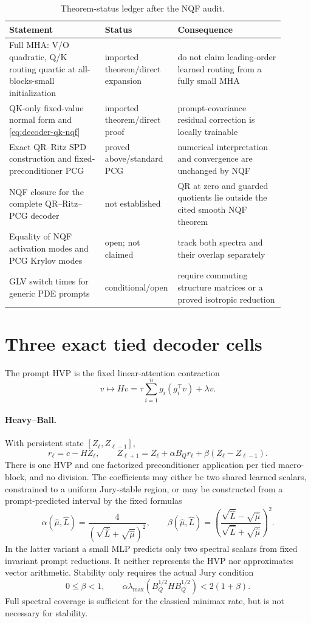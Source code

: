 \documentclass[11pt]{article}
\begin{document}
\begin{table}[t]
\centering
\small
\begin{tabular}{p{0.34\linewidth}p{0.18\linewidth}p{0.38\linewidth}}
\toprule
Statement & Status & Consequence \\
\midrule
Full MHA: V/O quadratic, Q/K routing quartic at all-blocks-small initialization
& imported theorem/direct expansion & do not claim leading-order learned
routing from a fully small MHA \\
QK-only fixed-value normal form and \eqref{eq:decoder-qk-nqf}
& imported theorem/direct proof & prompt-covariance residual correction is
locally trainable \\
Exact QR--Ritz SPD construction and fixed-preconditioner PCG
& proved above/standard PCG & numerical interpretation and convergence are
unchanged by NQF \\
NQF closure for the complete QR--Ritz--PCG decoder
& not established & QR at zero and guarded quotients lie outside the cited
smooth NQF theorem \\
Equality of NQF activation modes and PCG Krylov modes
& open; not claimed & track both spectra and their overlap separately \\
GLV switch times for generic PDE prompts
& conditional/open & require commuting structure matrices or a proved
isotropic reduction \\
\bottomrule
\end{tabular}
\caption{Theorem-status ledger after the NQF audit.}
\label{tab:nqf-status}
\end{table}

\section{Three exact tied decoder cells}

The prompt HVP is the fixed linear-attention contraction
\[
 v\longmapsto Hv
 =\tau\sum_{i=1}^n g_i(g_i^\top v)+\lambda v.
\]

\paragraph{Heavy--Ball.}
With persistent state $[Z_\ell,Z_{\ell-1}]$,
\[
 r_\ell=c-HZ_\ell,
 \qquad
 Z_{\ell+1}=Z_\ell+\alpha B_Qr_\ell
 +\beta(Z_\ell-Z_{\ell-1}).
\]
There is one HVP and one factorized preconditioner application per tied
macro-block, and no division.
The coefficients may either be two shared learned scalars, constrained to a
uniform Jury-stable region, or may be constructed from a prompt-predicted
interval by the fixed formulas
\[
 \alpha(\widehat\mu,\widehat L)
 =\frac{4}{(\sqrt{\widehat L}+\sqrt{\widehat\mu})^2},\qquad
 \beta(\widehat\mu,\widehat L)
 =\left(\frac{\sqrt{\widehat L}-\sqrt{\widehat\mu}}
 {\sqrt{\widehat L}+\sqrt{\widehat\mu}}\right)^2.
\]
In the latter variant a small MLP predicts only two spectral scalars from
fixed invariant prompt reductions.  It neither represents the HVP nor
approximates vector arithmetic.  Stability only requires the actual Jury
condition
\[
 0\leq\beta<1,\qquad
 \alpha\lambda_{\max}(B_Q^{1/2}HB_Q^{1/2})<2(1+\beta).
\]
Full spectral coverage is sufficient for the classical minimax rate, but is
not necessary for stability.
\end{document}
